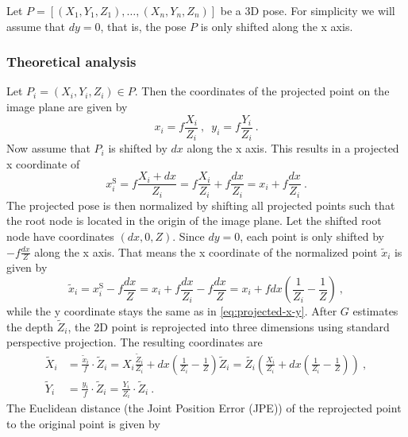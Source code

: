 Let $P = [(X_1, Y_1, Z_1), \dotsc, (X_n, Y_n, Z_n)]$ be a 3D pose.
For simplicity we will assume that $dy = 0$, that is, the pose $P$ is only shifted along the x axis.

\subsubsection{Theoretical analysis}
\label{sec:x-shift-error-theoretical}
Let $P_i = (X_i, Y_i, Z_i) \in P$.
Then the coordinates of the projected point on the image plane are given by
\begin{equation}
	x_i = f \frac{X_i}{Z_i} \ ,\enspace y_i = f \frac{Y_i}{Z_i} \ .
\end{equation}
Now assume that $P_i$ is shifted by $dx$ along the x axis.
This results in a projected x coordinate of
\begin{equation}
	\label{eq:projected-x-y}
	x_i^\mathrm{S} = f \frac{X_i + dx}{Z_i} = f \frac{X_i}{Z_i} + f \frac{dx}{Z_i} = x_i + f \frac{dx}{Z_i}\ .
\end{equation}
The projected pose is then normalized by shifting all projected points such that the root node is located in the origin of the image plane. 
Let the shifted root node have coordinates $(dx, 0, Z)$.
Since $dy = 0$, each point is only shifted by $- f \frac{dx}{Z}$ along the x axis.
That means the x coordinate of the normalized point $\widetilde{x}_i$ is given by
\begin{equation}
	\widetilde{x}_i
	= x_i^\mathrm{S} - f \frac{dx}{Z}
	= x_i + f \frac{dx}{Z_i} - f \frac{dx}{Z}
	= x_i + f dx (\frac{1}{Z_i} - \frac{1}{Z}) \ , 
\end{equation}
while the y coordinate stays the same as in \eqref{eq:projected-x-y}.
After $G$ estimates the depth $\widetilde{Z}_i$, the 2D point is reprojected into three dimensions using standard perspective projection. The resulting coordinates are 
\begin{align}
	\label{eq:re-projected-X}
	\widetilde{X}_i &= \frac{\widetilde{x}_i}{f} \cdot \widetilde{Z}_i
	= X_i \frac{\widetilde{Z}_i}{Z_i} + dx (\frac{1}{Z_i} - \frac{1}{Z}) \widetilde{Z}_i
	= \widetilde{Z_i} \left( \frac{X_i}{Z_i} + dx \left( \frac{1}{Z_i} - \frac{1}{Z} \right) \right) \ , \\
	\label{eq:re-projected-Y}
	\widetilde{Y}_i &= \frac{y_i}{f} \cdot \widetilde{Z}_i = \frac{Y_i}{Z_i} \cdot \widetilde{Z}_i \ .
\end{align}
The Euclidean distance (the Joint Position Error (JPE)) of the reprojected point to the original point is given by
